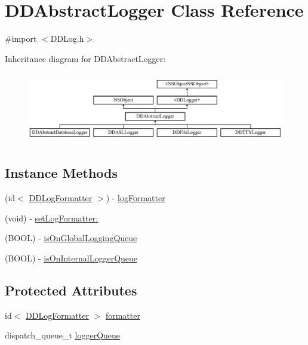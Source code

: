 \hypertarget{interface_d_d_abstract_logger}{\section{D\-D\-Abstract\-Logger Class Reference}
\label{interface_d_d_abstract_logger}
}


{\ttfamily \#import $<$D\-D\-Log.\-h$>$}

Inheritance diagram for D\-D\-Abstract\-Logger\-:\begin{figure}[H]
\begin{center}
\leavevmode
\includegraphics[height=3.146068cm]{interface_d_d_abstract_logger}
\end{center}
\end{figure}
\subsection*{Instance Methods}
\begin{DoxyCompactItemize}
\item 
(id$<$ \hyperlink{protocol_d_d_log_formatter-p}{D\-D\-Log\-Formatter} $>$) -\/ \hyperlink{interface_d_d_abstract_logger_a4839d52332a328cf00e91225798727c3}{log\-Formatter}
\item 
(void) -\/ \hyperlink{interface_d_d_abstract_logger_a66adcff49e28995ce45a470ec41623e1}{set\-Log\-Formatter\-:}
\item 
(B\-O\-O\-L) -\/ \hyperlink{interface_d_d_abstract_logger_af9a62f02a3605d46174ebc2c26f7a2d7}{is\-On\-Global\-Logging\-Queue}
\item 
(B\-O\-O\-L) -\/ \hyperlink{interface_d_d_abstract_logger_a955b2f52fc26c0ef9753b0e480ad9465}{is\-On\-Internal\-Logger\-Queue}
\end{DoxyCompactItemize}
\subsection*{Protected Attributes}
\begin{DoxyCompactItemize}
\item 
id$<$ \hyperlink{protocol_d_d_log_formatter-p}{D\-D\-Log\-Formatter} $>$ \hyperlink{interface_d_d_abstract_logger_a5272dacaffde3c3ec20255b71ef64707}{formatter}
\item 
dispatch\-\_\-queue\-\_\-t \hyperlink{interface_d_d_abstract_logger_a7904f4b279382819f718cf50bdc5478f}{logger\-Queue}
\end{DoxyCompactItemize}



